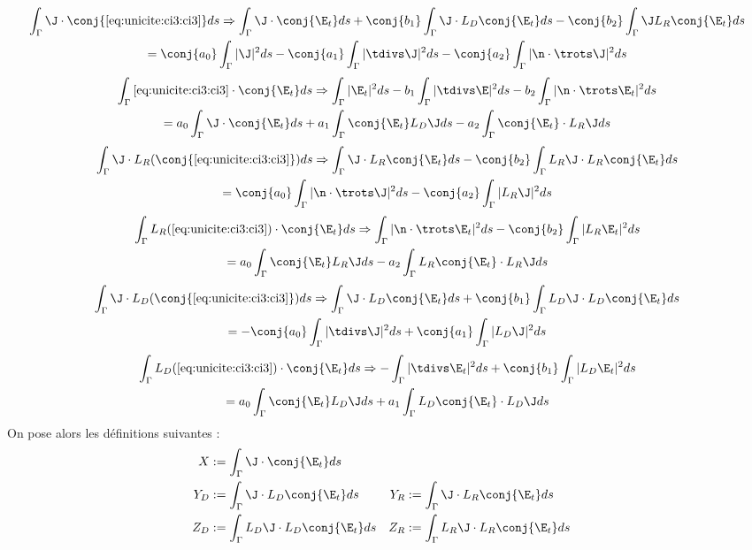 \begin{multline}
\label{eq:unicite:ci3:csu3-1}
\int_\Gamma \J\cdot\conj{\eqref{eq:unicite:ci3:ci3}}ds \Rightarrow
\int_\Gamma \J \cdot \conj{\E_t} ds  + \conj{b_1} \int_\Gamma \J\cdot L_D\conj{\E_t} ds - \conj{b_2} \int_\Gamma \J L_R\conj{\E_t} ds \\
= \conj{a_0} \int_\Gamma |\J|^2ds - \conj{a_1} \int_\Gamma |\tdivs \J|^2 ds - \conj{a_2} \int_\Gamma |\n \cdot \trots \J|^2 ds
\end{multline}
\begin{multline}
\label{eq:unicite:ci3:csu3-2}
\int_\Gamma \eqref{eq:unicite:ci3:ci3} \cdot \conj{\E_t} ds \Rightarrow
\int_\Gamma |\E_t|^2 ds  - b_1 \int_\Gamma | \tdivs \E |^2 ds - b_2 \int_\Gamma | \n \cdot \trots \E_t|^2 ds \\
= a_0 \int_\Gamma \J\cdot \conj{\E_t}ds + a_1 \int_\Gamma \conj{\E_t} L_D \J ds - a_2 \int_\Gamma \conj{\E_t} \cdot L_R \J ds
\end{multline}
\begin{multline}
\label{eq:unicite:ci3:csu3-3}
\int_\Gamma \J \cdot L_R ( \conj{\eqref{eq:unicite:ci3:ci3}} ) ds \Rightarrow
\int_\Gamma \J \cdot L_R \conj{\E_t} ds  - \conj{b_2} \int_\Gamma L_R \J \cdot L_R \conj{\E_t} ds \\
=  \conj{a_0} \int_\Gamma |\n \cdot \trots \J|^2ds - \conj{a_2} \int_\Gamma | L_R \J|^2 ds
\end{multline}
\begin{multline}
\label{eq:unicite:ci3:csu3-4}
\int_\Gamma  L_R ( \eqref{eq:unicite:ci3:ci3} ) \cdot \conj{\E_t} ds \Rightarrow
\int_\Gamma | \n \cdot \trots \E_t |^2 ds  - \conj{b_2} \int_\Gamma | L_R \E_t|^2 ds \\
= a_0 \int_\Gamma \conj{\E_t} L_R \J ds - a_2 \int_\Gamma L_R \conj{\E_t} \cdot L_R \J ds
\end{multline}
\begin{multline}
\label{eq:unicite:ci3:csu3-5}
\int_\Gamma \J \cdot L_D ( \conj{\eqref{eq:unicite:ci3:ci3}} ) ds \Rightarrow
\int_\Gamma \J \cdot L_D \conj{\E_t} ds  + \conj{b_1} \int_\Gamma L_D \J \cdot L_D \conj{\E_t} ds \\
= - \conj{a_0} \int_\Gamma |\tdivs \J|^2ds + \conj{a_1} \int_\Gamma | L_D \J|^2 ds
\end{multline}
\begin{multline}
\label{eq:unicite:ci3:csu3-6}
\int_\Gamma  L_D ( \eqref{eq:unicite:ci3:ci3} ) \cdot \conj{\E_t} ds \Rightarrow
-\int_\Gamma | \tdivs \E_t |^2 ds  + \conj{b_1} \int_\Gamma | L_D \E_t|^2 ds \\
= a_0 \int_\Gamma \conj{\E_t} L_D \J ds + a_1 \int_\Gamma L_D \conj{\E_t} \cdot L_D \J ds
\end{multline}
On pose alors les définitions suivantes :
\begin{align*}
X&:= \int_\Gamma \J \cdot \conj{\E_t} ds\\
Y_D&:= \int_\Gamma \J \cdot L_D \conj{\E_t} ds
&Y_R&:= \int_\Gamma \J \cdot L_R \conj{\E_t} ds\\
Z_D&:= \int_\Gamma L_D \J \cdot L_D \conj{\E_t} ds
&Z_R&:= \int_\Gamma L_R \J \cdot L_R \conj{\E_t} ds
\end{align*}

